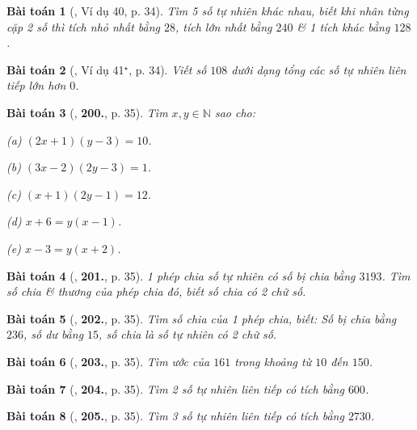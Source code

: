 \documentclass{article}
\numberwithin{equation}{section}
\newtheorem{baitoan}{Bài toán}[section]
\begin{document}
\begin{baitoan}[\cite{Binh_Toan_6_tap_1}, Ví dụ 40, p. 34]
	Tìm 5 số tự nhiên khác nhau, biết khi nhân từng cặp 2 số thì tích nhỏ nhất bằng $28$, tích lớn nhất bằng $240$ \& 1 tích khác bằng $128$.
\end{baitoan}

\begin{baitoan}[\cite{Binh_Toan_6_tap_1}, Ví dụ 41${}^\star$, p. 34]
	Viết số $108$ dưới dạng tổng các số tự nhiên liên tiếp lớn hơn $0$.
\end{baitoan}

\begin{baitoan}[\cite{Binh_Toan_6_tap_1}, \textbf{200.}, p. 35]
	Tìm $x,y\in\mathbb{N}$ sao cho:
	\begin{enumerate*}
		\item[(a)] $(2x + 1)(y - 3) = 10$.
		\item[(b)] $(3x - 2)(2y - 3) = 1$.
		\item[(c)] $(x + 1)(2y - 1) = 12$.
		\item[(d)] $x + 6 = y(x - 1)$.
		\item[(e)] $x - 3 = y(x + 2)$.
	\end{enumerate*}
\end{baitoan}

\begin{baitoan}[\cite{Binh_Toan_6_tap_1}, \textbf{201.}, p. 35]
	1 phép chia số tự nhiên có số bị chia bằng $3193$. Tìm số chia \& thương của phép chia đó, biết số chia có 2 chữ số.
\end{baitoan}

\begin{baitoan}[\cite{Binh_Toan_6_tap_1}, \textbf{202.}, p. 35]
	Tìm số chia của 1 phép chia, biết: Số bị chia bằng $236$, số dư bằng $15$, số chia là số tự nhiên có 2 chữ số.
\end{baitoan}	

\begin{baitoan}[\cite{Binh_Toan_6_tap_1}, \textbf{203.}, p. 35]
	Tìm ước của $161$ trong khoảng từ $10$ đến $150$.
\end{baitoan}

\begin{baitoan}[\cite{Binh_Toan_6_tap_1}, \textbf{204.}, p. 35]
	Tìm 2 số tự nhiên liên tiếp có tích bằng $600$.
\end{baitoan}

\begin{baitoan}[\cite{Binh_Toan_6_tap_1}, \textbf{205.}, p. 35]
	Tìm 3 số tự nhiên liên tiếp có tích bằng $2730$.
\end{baitoan}
\end{document}
